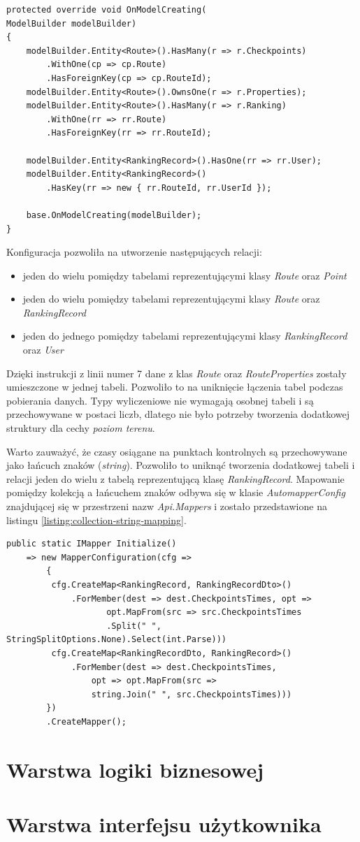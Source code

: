 \begin{lstlisting}[caption={Konfiguracja mapowania relacyjno-obiektowego},label=listing:context]
protected override void OnModelCreating(
ModelBuilder modelBuilder)
{
    modelBuilder.Entity<Route>().HasMany(r => r.Checkpoints)
    	.WithOne(cp => cp.Route)
    	.HasForeignKey(cp => cp.RouteId);
    modelBuilder.Entity<Route>().OwnsOne(r => r.Properties);
    modelBuilder.Entity<Route>().HasMany(r => r.Ranking)
    	.WithOne(rr => rr.Route)
        .HasForeignKey(rr => rr.RouteId);

    modelBuilder.Entity<RankingRecord>().HasOne(rr => rr.User);
    modelBuilder.Entity<RankingRecord>()
    	.HasKey(rr => new { rr.RouteId, rr.UserId });

    base.OnModelCreating(modelBuilder);
}
\end{lstlisting}
Konfiguracja pozwoliła na utworzenie następujących relacji:
\begin{itemize}
\item{jeden do wielu pomiędzy tabelami reprezentującymi klasy \textit{Route}} oraz \textit{Point}
\item{jeden do wielu pomiędzy tabelami reprezentującymi klasy \textit{Route}} oraz \textit{RankingRecord}
\item{jeden do jednego pomiędzy tabelami reprezentującymi klasy \textit{RankingRecord} oraz \textit{User}}
\end{itemize}
Dzięki instrukcji z linii numer 7 dane z klas \textit{Route} oraz \textit{RouteProperties} zostały umieszczone w jednej tabeli. Pozwoliło to na uniknięcie łączenia tabel podczas pobierania danych. Typy wyliczeniowe nie wymagają osobnej tabeli i są przechowywane w postaci liczb, dlatego nie było potrzeby tworzenia dodatkowej struktury dla cechy \textit{poziom terenu}.

Warto zauważyć, że czasy osiągane na punktach kontrolnych są przechowywane jako łańcuch znaków (\textit{string}). Pozwoliło to uniknąć tworzenia dodatkowej tabeli i relacji jeden do wielu z tabelą reprezentującą klasę \textit{RankingRecord}. Mapowanie pomiędzy kolekcją a łańcuchem znaków odbywa się w klasie \textit{AutomapperConfig} znajdującej się w przestrzeni nazw \textit{Api.Mappers} i zostało przedstawione na listingu \ref{listing:collection-string-mapping}.
\begin{lstlisting}[caption={Mapowanie pomiedzy kolekcją a łańcuchem znaków},label=collection-string-mapping]
public static IMapper Initialize()
    => new MapperConfiguration(cfg =>
        {
         cfg.CreateMap<RankingRecord, RankingRecordDto>()
             .ForMember(dest => dest.CheckpointsTimes, opt =>
                    opt.MapFrom(src => src.CheckpointsTimes
                    .Split(" ", StringSplitOptions.None).Select(int.Parse)))
         cfg.CreateMap<RankingRecordDto, RankingRecord>()
             .ForMember(dest => dest.CheckpointsTimes,
                 opt => opt.MapFrom(src => 
                 string.Join(" ", src.CheckpointsTimes)))
        })
        .CreateMapper();
\end{lstlisting}

\section{Warstwa logiki biznesowej}
\section{Warstwa interfejsu użytkownika}